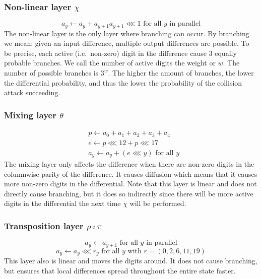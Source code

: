 \documentclass{report}
\begin{document}
\subsubsection{Non-linear layer $\chi$}

\begin{equation}
a_y \leftarrow a_y + a_{y+1}a_{y+1} \lll 1 \text{ for all } y \text{ in parallel}
\tag{$\chi$}
\end{equation}
The non-linear layer is the only layer where branching can occur. By branching we mean: given an input difference, multiple output differences are possible.
To be precise, each active (i.e.\ non-zero) digit in the difference cause 3 equally probable branches. We call the number of active digits the weight or $w$. The number of possible branches is $3^w$. The higher the amount of branches, the lower the differential probability, and thus the lower the probability of the collision attack succeeding.

\subsubsection{Mixing layer $\theta$}
\begin{equation}
\begin{split}
&p \leftarrow a_0 + a_1 + a_2 + a_3 + a_4 \\
&e \leftarrow p \lll 12 + p \lll 17 \\
&a_y \leftarrow a_y + (e \lll y) \text{ for all } y
\end{split}
\tag{$\theta$}
\end{equation}
The mixing layer only affects the difference when there are non-zero digits in the columnwise parity of the difference. It causes diffusion which means that it causes more non-zero digits in the differential. Note that this layer is linear and does not directly cause branching, but it does so indirectly since there will be more active digits in the differential the next time $\chi$ will be performed.

\subsubsection{Transposition layer $\rho \circ \pi$}
\begin{equation}
a_y \leftarrow a_{y+1} \text{ for all } y \text{ in parallel}
\tag{$\pi$}
\end{equation}
\begin{equation}
a_y \leftarrow a_y \lll r_y \text{ for all } y \text{ with } r = (0, 2, 6, 11, 19)
\tag{$\rho$}
\end{equation}
This layer also is linear and moves the digits around. It does not cause branching, but ensures that local differences spread throughout the entire state faster.
\end{document}
